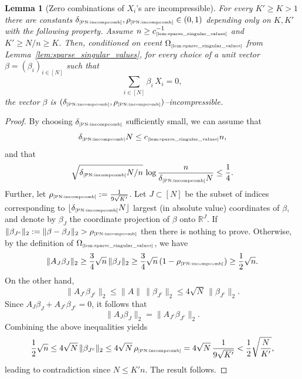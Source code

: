 \documentclass[11pt]{amsart}
\newtheorem{lemma}[theorem]{Lemma}
\theoremstyle{definition}
\theoremstyle{plain}
\newcommand{\R}{\mathbb{R}}
\def\R{{\mathbb R}}
\newcommand{\tref}[1]{\text{\tiny{\ref{#1}}}}
\begin{document}
\begin{lemma}[Zero combinations of $X_i$'s are incompressible]\label{PN:incompcomb}
For every $K'\geq K>1$ there are constants
$\delta_{\text{\tiny\ref{PN:incompcomb}}},
\rho_{\text{\tiny\ref{PN:incompcomb}}}\in(0,1)$
depending only on $K,K'$
with the following property.
Assume $n\geq c_{\text{\tiny\ref{lem:sparse_singular_values}}}^{-1}$ and
$K'\geq N/n\geq K$.
Then, conditioned on event
$
\Omega_{\text{\tiny\ref{lem:sparse_singular_values}}}
$
from Lemma~\ref{lem:sparse_singular_values},
for every choice of a unit vector $\beta=(\beta_i)_{i\in[N]}$
such that
$$
\sum_{i\in[N]}\beta_i\,X_i=0,
$$
the vector $\beta$ is $(\delta_{\text{\tiny\ref{PN:incompcomb}}},
\rho_{\text{\tiny\ref{PN:incompcomb}}})$--incompressible.
\end{lemma}
\begin{proof}
By choosing $\delta_{\tref{PN:incompcomb}}$
sufficiently small, we can assume that
$$
\delta_{\tref{PN:incompcomb}} N \le c_{\tref{lem:sparse_singular_values}} n,
$$
and that
$$
\sqrt{{\delta_{\tref{PN:incompcomb}} N}/{n}}\,\log\frac{n}{\delta_{\tref{PN:incompcomb}} N}\leq \frac{1}{4}.
$$
Further, let $\rho_{\text{\tiny\ref{PN:incompcomb}}}:=\frac{1}{9\sqrt{K'}}$.
Let \( J \subset [N] \) be the subset of indices corresponding to 
\( \lfloor\delta_{\tref{PN:incompcomb}} N\rfloor \) largest
(in absolute value) coordinates of \( \beta \),
and denote by $\beta_J$ the coordinate projection of $\beta$
onto $\R^J$.
If $\|\beta_{J^c}\|_2:=\|\beta-\beta_J\|_2>\rho_{\text{\tiny\ref{PN:incompcomb}}}$
then there is nothing to prove.
Otherwise, 
by the definition of $\Omega_{\text{\tiny\ref{lem:sparse_singular_values}}}$, we have
\[
\|A_J \beta_J\|_2 \ge
\frac{3}{4}\sqrt{n}\,\|\beta_J\|_2
\geq 
\frac{3}{4}\sqrt{n}\,(1-\rho_{\text{\tiny\ref{PN:incompcomb}}})
\geq
\frac{1}{2} \sqrt{n}.
\]
On the other hand,
\[
\|A_{J^c} \beta_{J^c}\|_2 
\le \|A\| \, \|\beta_{J^c}\|_2 
\le 4\sqrt{N} \, \|\beta_{J^c}\|_2.
\]
Since \( A_J \beta_J + A_{J^c} \beta_{J^c} = 0 \), it follows that
\[
\|A_J \beta_J\|_2 = \|A_{J^c} \beta_{J^c}\|_2.
\]
Combining the above inequalities yields
\[
\frac{1}{2}\sqrt{n} \le 4\sqrt{N} \, \|\beta_{J^c}\|_2
\leq 4\sqrt{N}\,\rho_{\text{\tiny\ref{PN:incompcomb}}}
=4\sqrt{N}\,\frac{1}{9\sqrt{K'}}<\frac{1}{2}\sqrt{\frac{N}{K'}},
\]
leading to contradiction since $N\leq K'n$. The result follows.
\end{proof}
\end{document}
